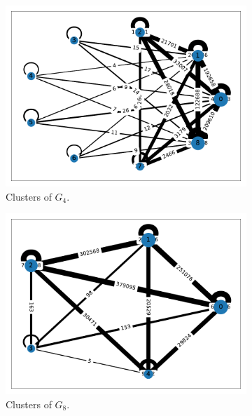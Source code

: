 \documentclass{prettytex/ox/mmsc-special-topic}
\begin{document}
  \begin{figure}
    \centering
    \begin{subfigure}[b]{0.3\textwidth}
      \centering
      \includegraphics[width=\textwidth]{figures/H-4-louvain.pdf}
      \caption{Clusters of $G_4$.}
      \label{fig:h-4}
    \end{subfigure}
    \hfill
    \begin{subfigure}[b]{0.3\textwidth}
      \centering
      \includegraphics[width=\textwidth]{figures/H-8-louvain.pdf}
      \caption{Clusters of $G_8$.}
      \label{fig:h-8}
    \end{subfigure}
    \hfill
    \begin{subfigure}[b]{0.3\textwidth}
      \centering

\end{subfigure}
\end{figure}
\end{document}
